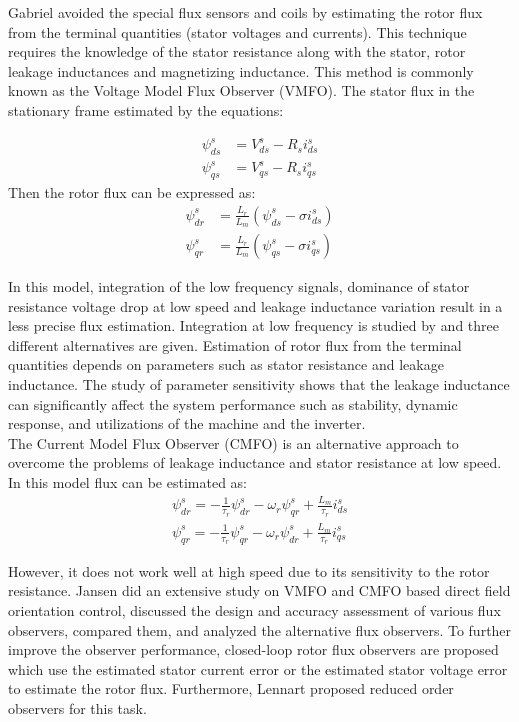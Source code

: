Gabriel \cite{Gabrie} avoided the special flux sensors and coils by estimating the rotor flux from the terminal quantities (stator voltages and currents). This technique requires the knowledge of the stator resistance along with the stator, rotor leakage inductances and magnetizing inductance. This method is commonly known as the Voltage Model Flux Observer (VMFO). The stator flux in the stationary frame estimated by the equations:


\begin{align}
\psi_{ds}^s&=V_{ds}^s-R_{s}i_{ds}^s\\
\psi_{qs}^s&=V_{qs}^s-R_{s}i_{qs}^s
\end{align}
Then the rotor flux can be expressed as:
\begin{align}
\psi_{dr}^s&=\frac{L_{r}}{L_{m}}(\psi_{ds}^s-\sigma i_{ds}^s)\\
\psi_{qr}^s&=\frac{L_{r}}{L_{m}}(\psi_{qs}^s-\sigma i_{qs}^s)
\end{align}

In this model, integration of the low frequency signals, dominance of stator resistance voltage drop at low speed and leakage inductance variation result in a less precise flux estimation. Integration at low frequency is studied by \cite{jun} and three different alternatives are given. Estimation of rotor flux from the terminal quantities depends on parameters such as stator resistance and leakage inductance. The study of parameter sensitivity shows that the leakage inductance can significantly affect the system performance such as stability, dynamic response, and utilizations of the machine and the inverter.\\


The Current Model Flux Observer (CMFO) is an alternative approach to overcome the problems of leakage inductance and stator resistance at low speed. In this model flux can be estimated as:
\begin{align}
\psi_{dr}^s=-\frac{1}{\tau_{r}}\psi_{dr}^s-\omega_{r}\psi_{qr}^s+\frac{L_{m}}{\tau_{r}}i_{ds}^s\\
\psi_{qr}^s=-\frac{1}{\tau_{r}}\psi_{qr}^s-\omega_{r}\psi_{dr}^s+\frac{L_{m}}{\tau_{r}}i_{qs}^s
\end{align}

However, it does not work well at high speed due to its sensitivity to the rotor resistance. Jansen \cite{pl} did an extensive study on VMFO and CMFO based direct field orientation control, discussed the design and accuracy assessment of various flux observers, compared them, and analyzed the alternative flux observers. To further improve the observer performance, closed-loop rotor flux observers are proposed which use the estimated stator current error \cite{pl,gc} or the estimated stator voltage error \cite{gc} to estimate the rotor flux. Furthermore, Lennart \cite{len} proposed reduced order observers for this task.

